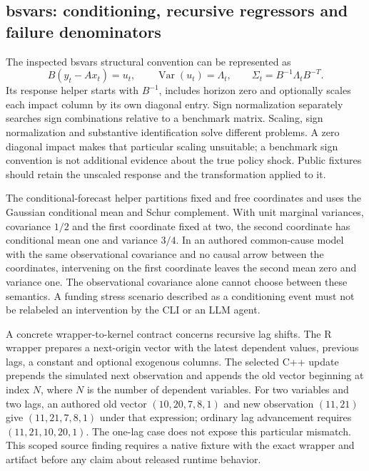 \subsection{bsvars: conditioning, recursive regressors and failure denominators}

The inspected bsvars structural convention can be represented as
\[
 B\left(y_t-Ax_t\right)=u_t,\qquad
 \operatorname{Var}(u_t)=\Lambda_t,
 \qquad \Sigma_t=B^{-1}\Lambda_tB^{-T}.
\]
Its response helper starts with $B^{-1}$, includes horizon zero and optionally scales each impact column by its own diagonal entry. Sign normalization separately searches sign combinations relative to a benchmark matrix. Scaling, sign normalization and substantive identification solve different problems. A zero diagonal impact makes that particular scaling unsuitable; a benchmark sign convention is not additional evidence about the true policy shock. Public fixtures should retain the unscaled response and the transformation applied to it.~\citep{exec25_cdyn_bsvars}

The conditional-forecast helper partitions fixed and free coordinates and uses the Gaussian conditional mean and Schur complement. With unit marginal variances, covariance $1/2$ and the first coordinate fixed at two, the second coordinate has conditional mean one and variance $3/4$. In an authored common-cause model with the same observational covariance and no causal arrow between the coordinates, intervening on the first coordinate leaves the second mean zero and variance one. The observational covariance alone cannot choose between these semantics. A funding stress scenario described as a conditioning event must not be relabeled an intervention by the CLI or an LLM agent.~\citep{exec25_cdyn_bsvars,exec25_cdyn_choice}

A concrete wrapper-to-kernel contract concerns recursive lag shifts. The R wrapper prepares a next-origin vector with the latest dependent values, previous lags, a constant and optional exogenous columns. The selected C++ update prepends the simulated next observation and appends the old vector beginning at index $N$, where $N$ is the number of dependent variables. For two variables and two lags, an authored old vector $(10,20,7,8,1)$ and new observation $(11,21)$ give $(11,21,7,8,1)$ under that expression; ordinary lag advancement requires $(11,21,10,20,1)$. The one-lag case does not expose this particular mismatch. This scoped source finding requires a native fixture with the exact wrapper and artifact before any claim about released runtime behavior.~\citep{exec25_cdyn_bsvars,exec25_cdyn_choice}

